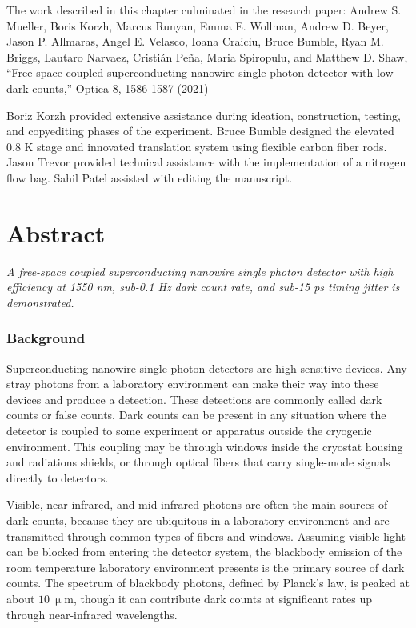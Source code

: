 \documentclass[11pt]{caltech_thesis} %
\begin{document}
The work described in this chapter culminated in the research paper: Andrew S. Mueller, Boris Korzh, Marcus Runyan, Emma E. Wollman, Andrew D. Beyer, Jason P. Allmaras, Angel E. Velasco, Ioana Craiciu, Bruce Bumble, Ryan M. Briggs, Lautaro Narvaez, Cristián Peña, Maria Spiropulu, and Matthew D. Shaw, ``Free-space coupled superconducting nanowire single-photon detector with low dark counts,'' \href{https://opg.optica.org/optica/fulltext.cfm?uri=optica-8-12-1586\&id=465726}{Optica 8, 1586-1587 (2021)}

Boriz Korzh provided extensive assistance during ideation, construction, testing, and copyediting phases of the experiment. Bruce Bumble designed the elevated 0.8 K stage and innovated translation system using flexible carbon fiber rods. Jason Trevor provided technical assistance with the implementation of a nitrogen flow bag. Sahil Patel assisted with editing the manuscript.

\hypertarget{abstract}{%
\section{Abstract}\label{abstract}}

\emph{A free-space coupled superconducting nanowire single photon detector with high efficiency at 1550 nm, sub-0.1 Hz dark count rate, and sub-15 ps timing jitter is demonstrated.}

\hypertarget{background}{%
\subsubsection{Background}\label{background}}

Superconducting nanowire single photon detectors are high sensitive devices. Any stray photons from a laboratory environment can make their way into these devices and produce a detection. These detections are commonly called dark counts or false counts. Dark counts can be present in any situation where the detector is coupled to some experiment or apparatus outside the cryogenic environment. This coupling may be through windows inside the cryostat housing and radiations shields, or through optical fibers that carry single-mode signals directly to detectors.

Visible, near-infrared, and mid-infrared photons are often the main sources of dark counts, because they are ubiquitous in a laboratory environment and are transmitted through common types of fibers and windows. Assuming visible light can be blocked from entering the detector system, the blackbody emission of the room temperature laboratory environment presents is the primary source of dark counts. The spectrum of blackbody photons, defined by Planck's law, is peaked at about $10~\mathrm{\upmu m}$, though it can contribute dark counts at significant rates up through near-infrared wavelengths.
\end{document}
